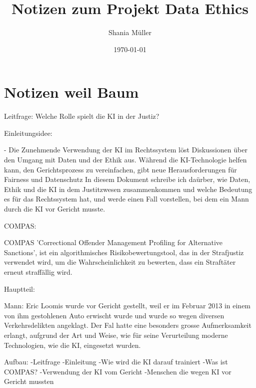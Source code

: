 \documentclass{article}
\title{Notizen zum Projekt Data Ethics}
\author{Shania Müller}
\date{\today}
\begin{document}
\maketitle


\tableofcontents



\section {Notizen weil Baum}

Leitfrage: Welche Rolle spielt die KI in der Justiz?  

Einleitungsidee: 

- Die Zunehmende Verwendung der KI im Rechtssystem löst Diskussionen über den 
Umgang mit Daten und der Ethik aus. Während die KI-Technologie helfen kann, den
Gerichtsprozess zu vereinfachen, gibt neue Herausforderungen für Fairness und Datenschutz
In diesem Dokument schreibe ich daürber, wie Daten, Ethik und die KI in dem Justitzwesen
zusammenkommen und welche Bedeutung es für das Rechtssystem hat, und werde einen Fall vorstellen, 
bei dem ein Mann durch die KI vor Gericht musste. 

COMPAS: 

COMPAS 'Correctional Offender Management Profiling for Alternative Sanctions', ist ein 
algorithmisches Risikobewertungstool, das in der Strafjustiz verwendet wird, um die 
Wahrscheinlichkeit zu bewerten, dass ein Straftäter erneut straffällig wird.


Hauptteil: 

Mann: Eric Loomis wurde vor Gericht gestellt, weil er im Februar 2013 in einem von ihm gestohlenen Auto 
erwischt wurde und wurde so wegen diversen Verkehrsdelikten angeklagt. Der Fal hatte eine besonders grosse 
Aufmerksamkeit erlangt, aufgrund der Art und Weise, wie für seine Verurteilung moderne
Technologien, wie die KI, eingesetzt wurden.  



Aufbau: -Leitfrage -Einleitung -Wie wird die KI darauf trainiert -Was ist COMPAS? -Verwendung der KI vom Gericht  -Menschen die wegen KI vor Gericht mussten



\printbibliography
\end{document}
